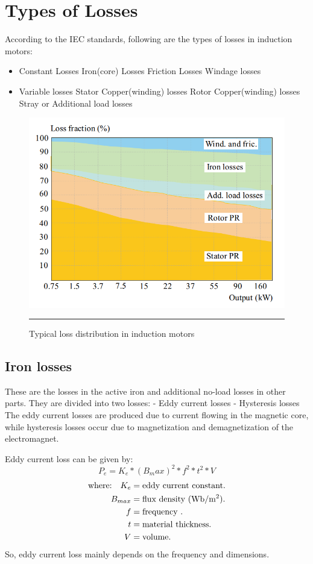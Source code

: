 \section{Types of Losses}
According to the IEC standards, following are the types of losses in induction motors:
\begin{itemize}
\item Constant Losses
\subitem Iron(core) Losses
\subitem Friction Losses
\subitem Windage losses
\item Variable losses
\subitem Stator Copper(winding) losses
\subitem Rotor Copper(winding) losses
\subitem Stray or Additional load losses 
\end{itemize}

\begin{figure}[htbp]
	\centering
		\includegraphics[width = 4.5in]{./Figures/MS/21.png}
		\rule{35em}{0.5pt}
	\caption{Typical loss distribution in induction motors}
	\label{fig:Typical loss distribution in induction motors}
\end{figure}

\subsection{Iron losses}
These are the losses in the active iron and additional no-load losses in other parts. They are divided into two losses:
-	Eddy current losses
-	Hysteresis losses
The eddy current losses are produced due to current flowing in the magnetic core, while hysteresis losses occur due to magnetization and demagnetization of the electromagnet.

Eddy current loss can be given by:
\begin{equation}
P_e=K_e * (B_max)^2 * f^2 * t^2 * V
\end{equation}
\begin{align*}
\text{where:}\quad
 K_e    &=  \text{eddy current constant.} \\
 B_{max}    &=  \text{flux density (Wb/m\textsuperscript{2}).} \\
 f    &=  \text{frequency .} \\
 t    &=  \text{material thickness.} \\
 V    &=  \text{volume.} \\
\end{align*}
So, eddy current loss mainly depends on the frequency and dimensions.

